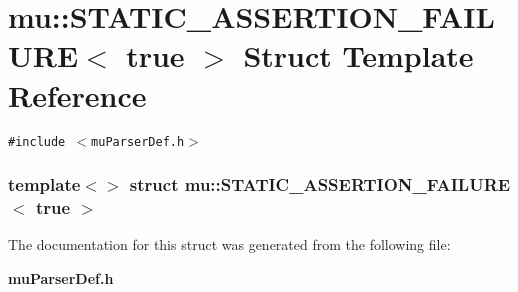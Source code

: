 \section{mu::STATIC\_\-ASSERTION\_\-FAILURE$<$ true $>$ Struct Template Reference}
\label{structmu_1_1STATIC__ASSERTION__FAILURE_3_01true_01_4}
{\tt \#include $<$muParserDef.h$>$}

\subsubsection*{template$<$$>$ struct mu::STATIC\_\-ASSERTION\_\-FAILURE$<$ true $>$}



The documentation for this struct was generated from the following file:\begin{CompactItemize}
\item 
{\bf muParserDef.h}\end{CompactItemize}
